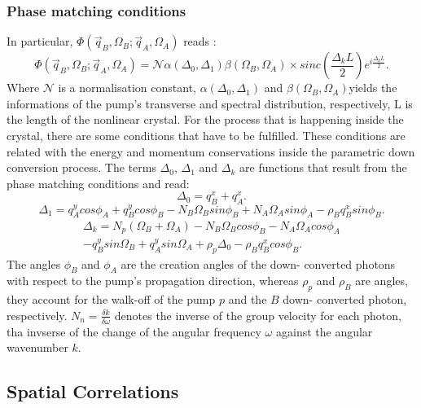 \subsubsection{Phase matching conditions}
In particular, $\Phi(\vec{q}_B,\Omega_B;\vec{q}_A,\Omega_A)$ reads \cite{omar}:
\begin{equation}
\label{eq:mode}
\Phi(\vec{q}_B,\Omega_B;\vec{q}_A,\Omega_A) = \mathcal{N} \alpha(\Delta_0,\Delta_1) \beta(\Omega_B,\Omega_A) \times
sinc \left( \frac{\Delta_k L}{2} \right) e^{i \frac{\Delta_k L}{2}}.
\end{equation}
Where $\mathcal{N}$ is a normalisation constant, $\alpha(\Delta_0,\Delta_1)$
and $\beta(\Omega_B,\Omega_A)$yields the informations of the pump's transverse 
and spectral distribution, respectively, L is the length of the nonlinear crystal.
For the process that is happening inside the crystal, there are some conditions that have to be fulfilled. These conditions are related with the energy and momentum conservations inside the parametric down conversion process.
The terms $\Delta_0$, $\Delta_1$ and $\Delta_k$ are functions that result from the phase matching conditions and read:
\begin{equation}
\Delta_0=q_B^x + q_A^x.
\end{equation}
\begin{equation}
\Delta_1= q_A^y cos\phi_A + q_B^y cos\phi_B - N_B \Omega_B sin\phi_B + N_A \Omega_A sin\phi_A - \rho_B q_B^x sin\phi_B .
\end{equation}
\begin{equation}
\begin{split}
\Delta_k=N_p(\Omega_B+\Omega_A)-N_B\Omega_B cos\phi_B - N_A\Omega_A cos\phi_A \\ -q_B^y sin\Omega_B + q_A^y sin\Omega_A + \rho_p \Delta_0 - \rho_B q_B^x cos\phi_B.
\end{split}
\end{equation}
The angles $\phi_B$ and $\phi_A$ are the creation angles of the down-
converted photons with respect to the pump’s
propagation direction, whereas $\rho_p$ and $\rho_B$ are angles, they account for
the walk-off of the pump $p$ and the $B$ down-
converted photon, respectively.  $N_n=\frac{\delta k}{\delta \omega}$ denotes the inverse of the group velocity for each photon, tha invserse 
of the change of the angular frequency $\omega$ against the angular wavenumber $k$.




\subsection{Spatial Correlations}\label{sec:spatialCorrelations}

